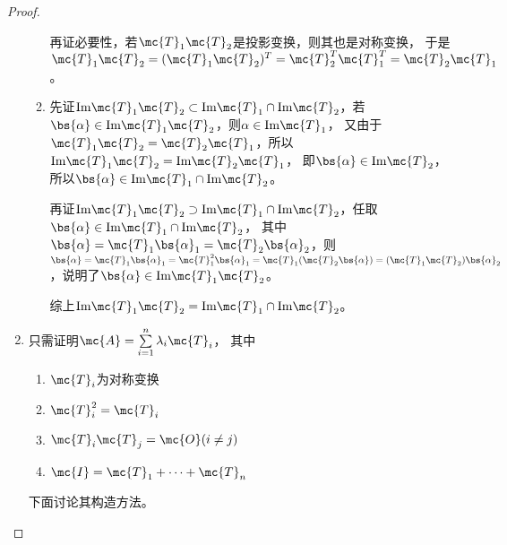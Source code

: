 \documentclass[12pt, a4paper, oneside, UTF8]{ctexbook}
\begin{document}
\begin{proof}
\begin{enumerate}[label=(\arabic*)]
\begin{enumerate}
        再证必要性，若$\mc{T}_1\mc{T}_2$是投影变换，则其也是对称变换，
        于是$\mc{T}_1\mc{T}_2=(\mc{T}_1\mc{T}_2)^T=\mc{T}_2^T\mc{T}_1^T=\mc{T}_2\mc{T}_1$。
            \item
        先证$\mathrm{Im}\mc{T}_1\mc{T}_2 \subset \mathrm{Im}\mc{T}_1 \cap \mathrm{Im}\mc{T}_2$，若$\bs{\alpha} \in \mathrm{Im}{\mc{T}_1\mc{T}_2}$，则$\alpha \in \mathrm{Im}\mc{T}_1$，
        又由于$\mc{T}_1\mc{T}_2=\mc{T}_2\mc{T}_1$，所以$\mathrm{Im}\mc{T}_1\mc{T}_2=\mathrm{Im}\mc{T}_2\mc{T}_1$，
        即$\bs{\alpha} \in \mathrm{Im}\mc{T}_2$，所以$\bs{\alpha} \in \mathrm{Im}\mc{T}_1 \cap \mathrm{Im}\mc{T}_2$。

        再证$\mathrm{Im}\mc{T}_1\mc{T}_2 \supset \mathrm{Im}\mc{T}_1 \cap \mathrm{Im}\mc{T}_2$，任取$\bs{\alpha} \in \mathrm{Im}\mc{T}_1 \cap \mathrm{Im}\mc{T}_2$，
        其中$\bs{\alpha}=\mc{T}_1\bs{\alpha}_1=\mc{T}_2\bs{\alpha}_2$，则
        $\bs{\alpha}=\mc{T}_1\bs{\alpha}_1=\mc{T}_1^2\bs{\alpha}_1=
        \mc{T}_1(\mc{T}_2\bs{\alpha})=(\mc{T}_1\mc{T}_2)\bs{\alpha}_2$，说明了$\bs{\alpha} \in \mathrm{Im}\mc{T}_1\mc{T}_2$。
        
        综上$\mathrm{Im}\mc{T}_1\mc{T}_2 = \mathrm{Im}\mc{T}_1 \cap \mathrm{Im}\mc{T}_2$。
        \end{enumerate}
    \item 只需证明$\mc{A}=\sum\limits_{i=1}^n \lambda_i \mc{T}_i$，
    其中
    \begin{enumerate}
        \item $\mc{T}_i$为对称变换
        \item $\mc{T}_i^2=\mc{T}_i$
        \item $\mc{T}_i\mc{T}_j=\mc{O}(i\neq j)$
        \item $\mc{I}=\mc{T}_1+\cdots+\mc{T}_n$
    \end{enumerate}
    下面讨论其构造方法。


\end{enumerate}
\end{proof}
\end{document}
